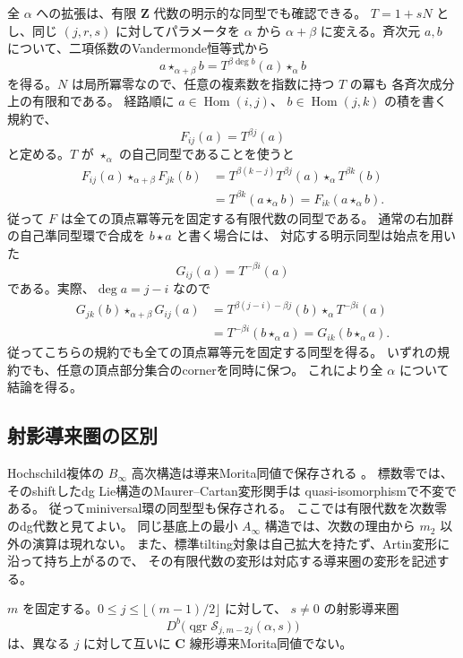 全 $\alpha$ への拡張は、有限 $\mathbf Z$ 代数の明示的な同型でも確認できる。
$T=1+sN$ とし、同じ $(j,r,s)$ に対してパラメータを $\alpha$ から
$\alpha+\beta$ に変える。斉次元 $a,b$ について、二項係数のVandermonde恒等式から
\[
 a\star_{\alpha+\beta}b
       =T^{\beta\deg b}(a)\star_\alpha b
\]
を得る。$N$ は局所冪零なので、任意の複素数を指数に持つ $T$ の冪も
各斉次成分上の有限和である。
経路順に $a\in\operatorname{Hom}(i,j)$、
$b\in\operatorname{Hom}(j,k)$ の積を書く規約で、
\[
 F_{ij}(a)=T^{\beta j}(a)
\]
と定める。$T$ が $\star_\alpha$ の自己同型であることを使うと
\[
 \begin{aligned}
 F_{ij}(a)\star_{\alpha+\beta}F_{jk}(b)
 &=T^{\beta(k-j)}T^{\beta j}(a)\star_\alpha T^{\beta k}(b)\\
 &=T^{\beta k}(a\star_\alpha b)
 =F_{ik}(a\star_\alpha b).
 \end{aligned}
\]
従って $F$ は全ての頂点冪等元を固定する有限代数の同型である。
通常の右加群の自己準同型環で合成を $b\star a$ と書く場合には、
対応する明示同型は始点を用いた
\[
 G_{ij}(a)=T^{-\beta i}(a)
\]
である。実際、$\deg a=j-i$ なので
\[
 \begin{aligned}
 G_{jk}(b)\star_{\alpha+\beta}G_{ij}(a)
 &=T^{\beta(j-i)-\beta j}(b)\star_\alpha T^{-\beta i}(a)\\
 &=T^{-\beta i}(b\star_\alpha a)
 =G_{ik}(b\star_\alpha a).
 \end{aligned}
\]
従ってこちらの規約でも全ての頂点冪等元を固定する同型を得る。
いずれの規約でも、任意の頂点部分集合のcornerを同時に保つ。
これにより全 $\alpha$ について結論を得る。

\subsection{射影導来圏の区別}

Hochschild複体の $B_\infty$ 高次構造は導来Morita同値で保存される
\cite[Theorem~3.2 and its corollary]{KellerDerived2003}。
標数零では、そのshiftしたdg Lie構造のMaurer--Cartan変形関手は
quasi-isomorphismで不変である\cite[Corollary~3.2]{Manetti2005}。
従ってminiversal環の同型型も保存される。
ここでは有限代数を次数零のdg代数と見てよい。
同じ基底上の最小 $A_\infty$ 構造では、次数の理由から $m_2$ 以外の演算は現れない。
また、標準tilting対象は自己拡大を持たず、Artin変形に沿って持ち上がるので、
その有限代数の変形は対応する導来圏の変形を記述する。

\begin{corollary}[同じ重みの異なる共鳴は導来非同値]
\label{cor:resonance-derived-inequivalence-v35}
$m$ を固定する。$0\le j\le\lfloor(m-1)/2\rfloor$ に対して、
$s\ne0$ の射影導来圏
\[
 D^b\bigl(\operatorname{qgr}\mathcal S_{j,m-2j}(\alpha,s)\bigr)
\]
は、異なる $j$ に対して互いに $\mathbf C$ 線形導来Morita同値でない。
\end{corollary}

